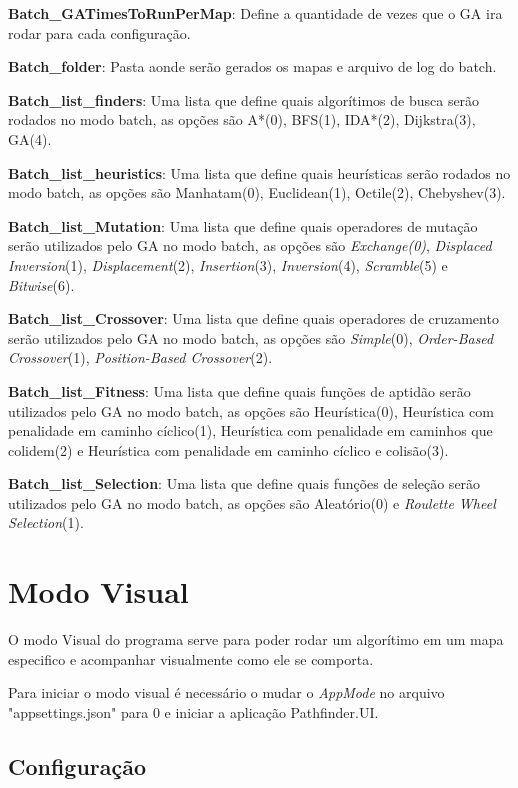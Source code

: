 \textbf{Batch\_GATimesToRunPerMap}: Define a quantidade de vezes que o GA ira rodar para cada configuração.

\textbf{Batch\_folder}: Pasta aonde serão gerados os mapas e arquivo de log do batch.

\textbf{Batch\_list\_finders}: Uma lista que define quais algorítimos de busca serão rodados no modo batch, as opções são  A\**(0), BFS(1), IDA\**(2), Dijkstra(3), GA(4).

\textbf{Batch\_list\_heuristics}: Uma lista que define quais heurísticas serão rodados no modo batch, as opções são Manhatam(0), Euclidean(1), Octile(2), Chebyshev(3).

\textbf{Batch\_list\_Mutation}: Uma lista que define quais operadores de mutação serão utilizados pelo GA no modo batch, as opções são  \textit{Exchange(0)}, \textit{Displaced Inversion}(1), \textit{Displacement}(2), \textit{Insertion}(3), \textit{Inversion}(4), \textit{Scramble}(5) e \textit{Bitwise}(6).

\textbf{Batch\_list\_Crossover}: Uma lista que define quais operadores de cruzamento serão utilizados pelo GA no modo batch, as opções são  \textit{Simple}(0), \textit{Order-Based Crossover}(1), \textit{Position-Based Crossover}(2).

\textbf{Batch\_list\_Fitness}: Uma lista que define quais funções de aptidão serão utilizados pelo GA no modo batch, as opções são Heurística(0), Heurística com penalidade em caminho cíclico(1), Heurística com penalidade em caminhos que colidem(2) e Heurística com penalidade em caminho cíclico e colisão(3).

\textbf{Batch\_list\_Selection}: Uma lista que define quais funções de seleção serão utilizados pelo GA no modo batch, as opções são  Aleatório(0) e \textit{Roulette Wheel Selection}(1).

\section{Modo Visual}

O modo Visual do programa serve para poder rodar um algorítimo em um mapa especifico e acompanhar visualmente como ele se comporta.

Para iniciar o modo visual é necessário o mudar o \textit{AppMode} no arquivo "appsettings.json" para 0 e iniciar a aplicação Pathfinder.UI.


\subsection{Configuração}


